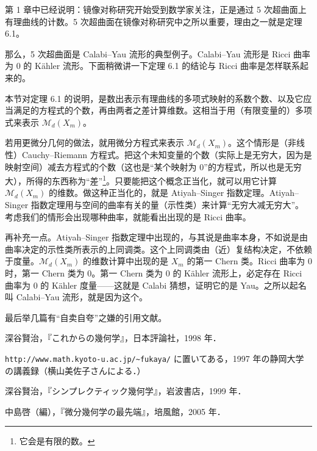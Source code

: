 第 1 章中已经说明：镜像对称研究开始受到数学家关注，正是通过 5 次超曲面上有理曲线的计数。5 次超曲面在镜像对称研究中之所以重要，理由之一就是定理 6.1。

那么，5 次超曲面是 Calabi--Yau 流形的典型例子。Calabi--Yau 流形是 Ricci 曲率为 0 的 Kähler 流形。下面稍微讲一下定理 6.1 的结论与 Ricci 曲率是怎样联系起来的。

本节对定理 6.1 的说明，是数出表示有理曲线的多项式映射的系数个数、以及它应当满足的方程式的个数，再由两者之差计算维数。这相当于用（有限变量的）多项式来表示 $\mathcal{M}_d(X_m)$。

若用更微分几何的做法，就用微分方程式来表示 $\mathcal{M}_d(X_m)$。这个情形是（非线性）Cauchy--Riemann 方程式。把这个未知变量的个数（实际上是无穷大，因为是映射空间）减去方程式的个数（这也是“某个映射为 0”的方程式，所以也是无穷大），所得的东西称为“差”\footnote{它会是有限的数。}。只要能把这个概念正当化，就可以用它计算 $\mathcal{M}_d(X_m)$ 的维数。做这种正当化的，就是 Atiyah--Singer 指数定理。Atiyah--Singer 指数定理用与空间的曲率有关的量（示性类）来计算“无穷大减无穷大”。考虑我们的情形会出现哪种曲率，就能看出出现的是 Ricci 曲率。

再补充一点。Atiyah--Singer 指数定理中出现的，与其说是曲率本身，不如说是由曲率决定的示性类所表示的上同调类。这个上同调类由（近）复结构决定，不依赖于度量。$\mathcal{M}_d(X_m)$ 的维数计算中出现的是 $X_m$ 的第一 Chern 类。Ricci 曲率为 0 时，第一 Chern 类为 0。第一 Chern 类为 0 的 Kähler 流形上，必定存在 Ricci 曲率为 0 的 Kähler 度量——这就是 Calabi 猜想，证明它的是 Yau。之所以起名叫 Calabi--Yau 流形，就是因为这个。

最后举几篇有“自卖自夸”之嫌的引用文献。

\begin{reflist}
\item[{[1]}] 深谷賢治，『これからの幾何学』，日本評論社，1998 年．
\item[{[2]}] \texttt{http://www.math.kyoto-u.ac.jp/\~{}fukaya/} に置いてある，1997 年の静岡大学の講義録（横山美佐子さんによる．）
\item[{[3]}] 深谷賢治，『シンプレクティック幾何学』，岩波書店，1999 年．
\item[{[4]}] 中島啓（編），『微分幾何学の最先端』，培風館，2005 年．
\end{reflist}

